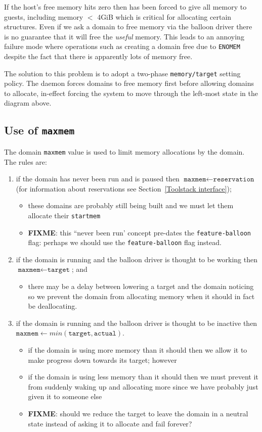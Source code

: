 \documentclass{article}
\begin{document}
If the host's free memory hits zero then \xen{} has been forced to give all memory to guests, including memory $<$ 4GiB which is critical for allocating certain structures. Even if we ask a domain to free memory via the balloon driver there is no guarantee that it will free the {\em useful} memory. This leads to an annoying failure mode where operations such as creating a domain free due to \texttt{ENOMEM} despite the fact that there is apparently lots of memory free.

The solution to this problem is to adopt a two-phase \texttt{memory/target} setting policy. The \squeezed{} daemon forces domains to free memory first before allowing domains to allocate, in-effect forcing the system to move through the left-most state in the diagram above.


\subsection{Use of \texttt{maxmem}}
\label{maxmem}

The \xen{} domain \texttt{maxmem} value is used to limit memory allocations by the domain. The rules are:
\begin{enumerate}
\item if the domain has never been run and is paused then $\texttt{maxmem}\leftarrow\texttt{reservation}$ (for information about reservations see Section~\ref{Toolstack interface});
\begin{itemize}
\item these domains are probably still being built and we must let them allocate their \texttt{startmem}
\item \textbf{FIXME}: this ``never been run' concept pre-dates the \texttt{feature-balloon} flag: perhaps we should use the \texttt{feature-balloon} flag instead.
\end{itemize}
\item if the domain is running and the balloon driver is thought to be working then $\texttt{maxmem}\leftarrow\texttt{target}$; and
\begin{itemize}
\item there may be a delay between lowering a target and the domain noticing so we prevent the domain from allocating memory when it should in fact be deallocating.
\end{itemize}
\item if the domain is running and the balloon driver is thought to be inactive then $\texttt{maxmem}\leftarrow \mathit{min}(\texttt{target}, \texttt{actual})$.
\begin{itemize}
\item if the domain is using more memory than it should then we allow it to make progress down towards its target; however
\item if the domain is using less memory than it should then we must prevent it from suddenly waking up and allocating more since we have probably just given it to someone else
\item \textbf{FIXME}: should we reduce the target to leave the domain in a neutral state instead of asking it to allocate and fail forever?
\end{itemize}
\end{enumerate}
   
\end{document}
